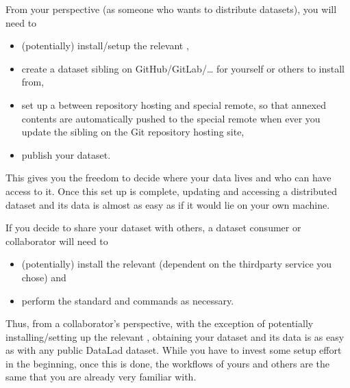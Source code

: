 \sphinxAtStartPar
From your perspective (as someone who wants to distribute datasets), you will
need to
\begin{itemize}
\item {} 
\sphinxAtStartPar
(potentially) install/setup the relevant ,

\item {} 
\sphinxAtStartPar
create a dataset sibling on GitHub/GitLab/… for yourself or others to install from,

\item {} 
\sphinxAtStartPar
set up a  between repository hosting and special remote, so that annexed contents are automatically pushed to the special remote when ever you update the sibling on the Git repository hosting site,

\item {} 
\sphinxAtStartPar
publish your dataset.

\end{itemize}

\sphinxAtStartPar
This gives you the freedom to decide where your data lives and
who can have access to it. Once this set up is complete, updating and
accessing a distributed dataset and its data is almost as easy as if it would
lie on your own machine.

\sphinxAtStartPar
If you decide to share your dataset with others, a dataset consumer or collaborator will need to
\begin{itemize}
\item {} 
\sphinxAtStartPar
(potentially) install the relevant  (dependent on the third\sphinxhyphen{}party service you chose) and

\item {} 
\sphinxAtStartPar
perform the standard  and  commands
as necessary.

\end{itemize}

\sphinxAtStartPar
Thus, from a collaborator’s perspective, with the exception of potentially
installing/setting up the relevant , obtaining your dataset and its
data is as easy as with any public DataLad dataset.
While you have to invest some setup effort in the beginning, once this
is done, the workflows of yours and others are the same that you are already
very familiar with.

